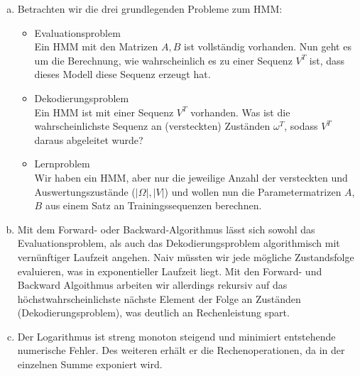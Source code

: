 \begin{enumerate}[a)]
	\item Betrachten wir die drei grundlegenden Probleme zum HMM:
	\begin{itemize}
		\item Evaluationsproblem\\
		Ein HMM mit den Matrizen $A,B$ ist vollständig vorhanden. Nun geht es um die Berechnung, wie wahrscheinlich es zu einer Sequenz $V^T$ ist, dass dieses Modell diese Sequenz erzeugt hat.
		\item Dekodierungsproblem\\
		Ein HMM ist mit einer Sequenz $V^T$ vorhanden. Was ist die wahrscheinlichste Sequenz an (versteckten) Zuständen $\omega^T$, sodass $V^T$ daraus abgeleitet wurde?
		\item Lernproblem\\
		Wir haben ein HMM, aber nur die jeweilige Anzahl der versteckten und Auswertungszustände ($|\Omega|, | V|$) und wollen nun die Parametermatrizen $A$,$B$ aus einem Satz an Trainingssequenzen berechnen.
	\end{itemize}
	\item Mit dem Forward- oder Backward-Algorithmus lässt sich sowohl das Evaluationsproblem, als auch das Dekodierungsproblem algorithmisch mit vernünftiger Laufzeit angehen. Naiv müssten wir jede mögliche Zustandsfolge evaluieren, was in exponentieller Laufzeit liegt. Mit den Forward- und Backward Algoithmus arbeiten wir allerdings rekursiv auf das höchstwahrscheinlichste nächste Element der Folge an Zuständen (Dekodierungsproblem), was deutlich an Rechenleistung spart.
	\item Der Logarithmus ist streng monoton steigend und minimiert entstehende numerische Fehler. Des weiteren erhält er die Rechenoperationen, da in der einzelnen Summe exponiert wird.
\end{enumerate}

